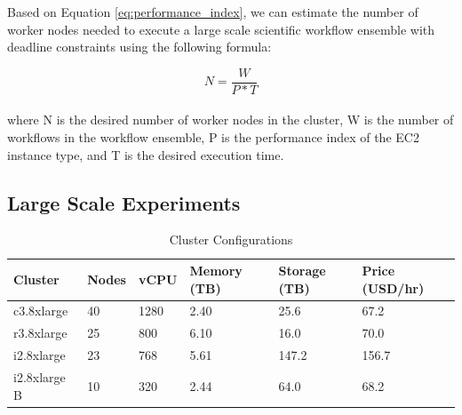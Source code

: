 Based on Equation \ref{eq:performance_index}, we can estimate the number of worker nodes needed to execute a large scale scientific workflow ensemble with deadline constraints using the following formula:

\begin{equation}
N =\frac{W}{P * T}
\label{eq:node_estimation} 
\end{equation}
\\
where N is the desired number of worker nodes in the cluster, W is the number of workflows in the workflow ensemble, P is the performance index of the EC2 instance type, and T is the desired execution time. 



\subsection{Large Scale Experiments}
\label{v2_sec:subsec:large_scale}


\begin{table}[t!]
\caption{Cluster Configurations}
\label{tbl:cluster_config}
\centering
\begin{tabular}{|p{1.4cm}|p{0.9cm}|p{0.9cm}|p{0.9cm}|p{0.9cm}|p{0.9cm}|}
\hline
Cluster & Nodes & vCPU & Memory (TB) & Storage (TB)&Price (USD/hr)\\ \hline
c3.8xlarge & 40 & 1280 & 2.40 & 25.6 & 67.2\\ \hline
r3.8xlarge & 25 & 800  & 6.10 & 16.0 & 70.0\\ \hline
i2.8xlarge & 23 & 768  & 5.61 & 147.2 & 156.7\\ \hline
i2.8xlarge B & 10 & 320  & 2.44 & 64.0 & 68.2\\ \hline
\end{tabular}
\end{table}

